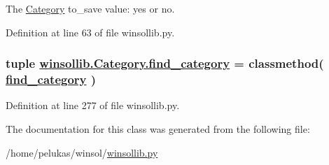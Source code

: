 The \hyperlink{classwinsollib_1_1Category}{Category} to\_\-save value: yes or no. 



Definition at line 63 of file winsollib.py.\hypertarget{classwinsollib_1_1Category_ced2fd769fd79d564f6b5fc588797d2d}{
\subsubsection[find\_\-category]{\setlength{\rightskip}{0pt plus 5cm}tuple \hyperlink{classwinsollib_1_1Category_ced2fd769fd79d564f6b5fc588797d2d}{winsollib.Category.find\_\-category} = classmethod( \hyperlink{classwinsollib_1_1Category_ced2fd769fd79d564f6b5fc588797d2d}{find\_\-category} )}}
\label{classwinsollib_1_1Category_ced2fd769fd79d564f6b5fc588797d2d}




Definition at line 277 of file winsollib.py.

The documentation for this class was generated from the following file:\begin{CompactItemize}
\item 
/home/pelukas/winsol/\hyperlink{winsollib_8py}{winsollib.py}\end{CompactItemize}
